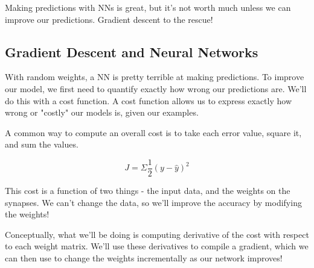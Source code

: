 \documentclass[]{article}
\begin{document}
Making predictions with NNs is great, but it's not worth much unless we can improve our predictions. Gradient descent to the rescue!

\subsection{Gradient Descent and Neural Networks}
With random weights, a NN is pretty terrible at making predictions. To improve our model, we first need to quantify exactly how wrong our predictions are. We'll do this with a cost function. A cost function allows us to express exactly how wrong or "costly" our models is, given our examples.

A common way to compute an overall cost is to take each error value, square it, and sum the values. 

\begin{equation}
	J = \Sigma \frac{1}{2}(y- \hat{y})^{2}
\end{equation}

This cost is a function of two things - the input data, and the weights on the synapses. We can't change the data, so we'll improve the accuracy by modifying the weights!

Conceptually, what we'll be doing is computing derivative of the cost with respect to each weight matrix. We'll use these derivatives to compile a gradient, which we can then use to change the weights incrementally as our network improves!
\end{document}
